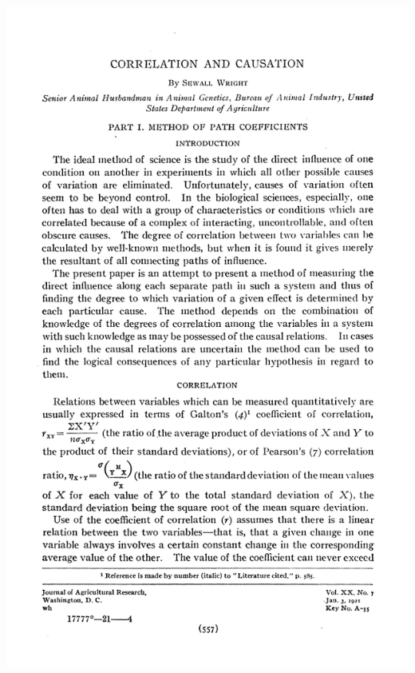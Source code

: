 \documentclass{beamer}
\begin{document}
\begin{frame}

\centering
\includegraphics[height = \textheight]{figures/wright1921_p1}

\end{frame}
\end{document}

